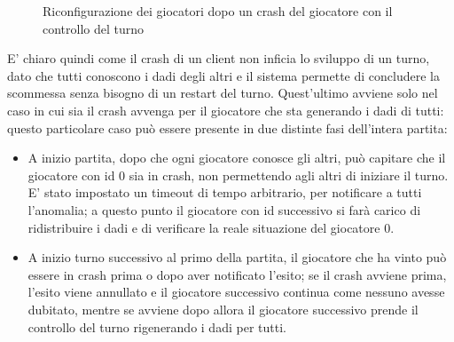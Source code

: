 \documentclass{llncs}
\begin{document}
\begin{figure}[H]
\begin{minipage}{0.45\textwidth}
	\end{minipage}
	\caption{\small{Riconfigurazione dei giocatori dopo un crash del giocatore con il controllo del turno}}
\end{figure}
E' chiaro quindi come il crash di un client non inficia lo sviluppo di un turno, dato che tutti conoscono i dadi degli altri e il sistema permette di concludere la scommessa senza bisogno di un restart del turno. Quest'ultimo avviene solo nel caso in cui sia il crash avvenga per il giocatore che sta generando i dadi di tutti: questo particolare caso può essere presente in due distinte fasi dell'intera partita:
\begin{itemize}
	\item A inizio partita, dopo che ogni giocatore conosce gli altri, può capitare che il giocatore con id 0 sia in crash, non permettendo agli altri di iniziare il turno. E' stato impostato un timeout di tempo arbitrario, per notificare a tutti l'anomalia; a questo punto il giocatore con id successivo si farà carico di ridistribuire i dadi e di verificare la reale situazione del giocatore 0.
	\item A inizio turno successivo al primo della partita, il giocatore che ha vinto può essere in crash prima o dopo aver notificato l'esito; se il crash avviene prima, l'esito viene annullato e il giocatore successivo continua come nessuno avesse dubitato, mentre se avviene dopo allora il giocatore successivo prende il controllo del turno rigenerando i dadi per tutti.
\end{itemize}
\end{document}
